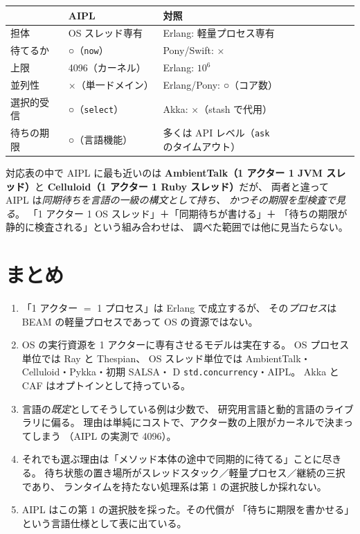 \documentclass[11pt,a4paper]{ltjsarticle}
\newcommand{\yes}{\textbf{○}}
\newcommand{\no}{×}
\begin{document}
\begin{center}
\small
\begin{tabular}{@{}lll@{}}
\toprule
 & AIPL & 対照 \\
\midrule
担体          & OS スレッド専有 & Erlang: 軽量プロセス専有 \\
待てるか      & \yes（\texttt{now}）& Pony/Swift: \no \\
上限          & 4096（カーネル）& Erlang: $10^{6}$ \\
並列性        & \no（単一ドメイン）& Erlang/Pony: \yes（コア数） \\
選択的受信    & \yes（\texttt{select}）& Akka: \no（stash で代用）\\
待ちの期限    & \yes（言語機能）& 多くは API レベル（\texttt{ask} のタイムアウト）\\
\bottomrule
\end{tabular}
\end{center}

対応表の中で AIPL に最も近いのは
\textbf{AmbientTalk（1 アクター 1 JVM スレッド）}と
\textbf{Celluloid（1 アクター 1 Ruby スレッド）}だが、
両者と違って AIPL は\emph{同期待ちを言語の一級の構文として持ち、
かつその期限を型検査で見る}。
「1 アクター 1 OS スレッド」＋「同期待ちが書ける」＋
「待ちの期限が静的に検査される」という組み合わせは、
調べた範囲では他に見当たらない。

\section{まとめ}

\begin{enumerate}
\item 「1 アクター $=$ 1 プロセス」は Erlang で成立するが、
  その\emph{プロセス}は BEAM の軽量プロセスであって OS の資源ではない。
\item OS の実行資源を 1 アクターに専有させるモデルは実在する。
  OS プロセス単位では Ray と Thespian、
  OS スレッド単位では AmbientTalk・Celluloid・Pykka・初期 SALSA・
  D \texttt{std.concurrency}・AIPL。
  Akka と CAF はオプトインとして持っている。
\item 言語の\emph{既定}としてそうしている例は少数で、
  研究用言語と動的言語のライブラリに偏る。
  理由は単純にコストで、アクター数の上限がカーネルで決まってしまう
  （AIPL の実測で 4096）。
\item それでも選ぶ理由は「メソッド本体の途中で同期的に待てる」ことに尽きる。
  待ち状態の置き場所がスレッドスタック／軽量プロセス／継続の三択であり、
  ランタイムを持たない処理系は第 1 の選択肢しか採れない。
\item AIPL はこの第 1 の選択肢を採った。その代償が
  「待ちに期限を書かせる」という言語仕様として表に出ている。
\end{enumerate}
\end{document}
